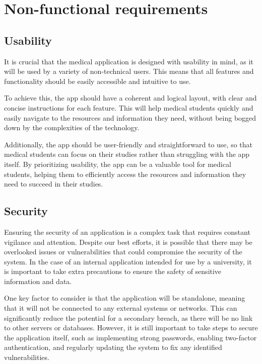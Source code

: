 \documentclass[singlespacing,12pt,parskip,headsepline,consistentlayout]{article}
\begin{document}
\section{Non-functional requirements}
\subsection{Usability}

It is crucial that the medical application is designed with usability in mind, as it will be used by a variety of non-technical users. This means that all features and functionality should be easily accessible and intuitive to use.

To achieve this, the app should have a coherent and logical layout, with clear and concise instructions for each feature. This will help medical students quickly and easily navigate to the resources and information they need, without being bogged down by the complexities of the technology.

Additionally, the app should be user-friendly and straightforward to use, so that medical students can focus on their studies rather than struggling with the app itself. By prioritizing usability, the app can be a valuable tool for medical students, helping them to efficiently access the resources and information they need to succeed in their studies.

\subsection{Security}

Ensuring the security of an application is a complex task that requires constant vigilance and attention. Despite our best efforts, it is possible that there may be overlooked issues or vulnerabilities that could compromise the security of the system. In the case of an internal application intended for use by a university, it is important to take extra precautions to ensure the safety of sensitive information and data.

One key factor to consider is that the application will be standalone, meaning that it will not be connected to any external systems or networks. This can significantly reduce the potential for a secondary breach, as there will be no link to other servers or databases. However, it is still important to take steps to secure the application itself, such as implementing strong passwords, enabling two-factor authentication, and regularly updating the system to fix any identified vulnerabilities.
\end{document}
